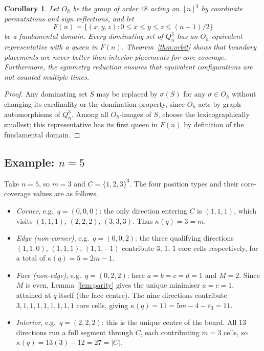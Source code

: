 \documentclass[11pt]{article}
\newtheorem{corollary}[theorem]{Corollary}
\begin{document}
\begin{corollary}
\label{cor:fundomain}
Let $O_h$ be the group of order $48$ acting on $[n]^3$ by coordinate
permutations and sign reflections, and let
\[
  F(n) = \bigl\{(x,y,z): 0 \leq x \leq y \leq z \leq (n-1)/2\bigr\}
\]
be a fundamental domain. Every dominating set of $Q^3_n$ has an
$O_h$-equivalent representative with a queen in $F(n)$. Theorem~\ref{thm:orbit}
shows that boundary placements are never better than interior placements for
core coverage. Furthermore, the symmetry reduction ensures that equivalent
configurations are not counted multiple times.
\end{corollary}

\begin{proof}
Any dominating set $S$ may be replaced by $\sigma(S)$ for any $\sigma \in O_h$
without changing its cardinality or the domination property, since $O_h$ acts by
graph automorphisms of $Q^3_n$. Among all $O_h$-images of $S$, choose the
lexicographically smallest; this representative has its first queen in $F(n)$
by definition of the fundamental domain.
\end{proof}

\subsection*{Example: $n = 5$}

Take $n = 5$, so $m = 3$ and $C = \{1,2,3\}^3$. The four position types and
their core-coverage values are as follows.
\begin{itemize}
  \item \emph{Corner}, e.g.\ $q = (0,0,0)$: the only direction entering $C$ is
        $(1,1,1)$, which visits $(1,1,1)$, $(2,2,2)$, $(3,3,3)$. Thus
        $\kappa(q) = 3 = m$.

  \item \emph{Edge (non-corner)}, e.g.\ $q = (0,0,2)$: the three qualifying
        directions $(1,1,0)$, $(1,1,1)$, $(1,1,-1)$ contribute $3$, $1$, $1$
        core cells respectively, for a total of $\kappa(q) = 5 = 2m-1$.

  \item \emph{Face (non-edge)}, e.g.\ $q = (0,2,2)$: here $a = b = c = d = 1$
        and $M = 2$. Since $M$ is even, Lemma~\ref{lem:parity} gives the unique
        minimiser $a = c = 1$, attained at $q$ itself (the face centre). The
        nine directions contribute $3,1,1,1,1,1,1,1,1$ core cells, giving
        $\kappa(q) = 11 = 5m - 4 - \varepsilon_3 = 11$.

  \item \emph{Interior}, e.g.\ $q = (2,2,2)$: this is the unique centre of the
        board. All 13 directions run a full segment through $C$, each
        contributing $m = 3$ cells, so $\kappa(q) = 13(3)-12 = 27 = |C|$.
\end{itemize}
\end{document}
